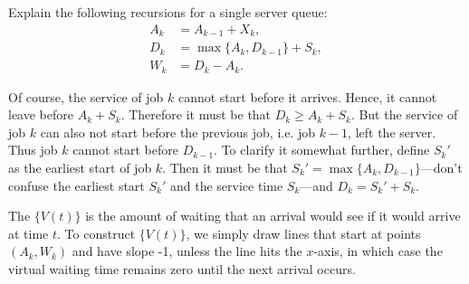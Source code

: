 \begin{extra}
\begin{solution}
\begin{comment}
\begin{pyconsole}
import lea

W = 3
S = lea.vals(1, 2)
S
X = lea.vals(1, 3)
X

# This is WQ1
W = lea.max_of(W + S - X, 0, fast=True)
W

# This is WQ2
W = lea.max_of(W + S - X, 0, fast=True)
W
\end{pyconsole}
Great! Our handiwork matches with the computer's results. 
\end{comment}

\end{solution}
\end{extra}



\begin{exercise} 
Explain the following recursions for a single server queue: 
\begin{equation}
 \label{eq:45}
 \begin{split}
 A_k &= A_{k-1} + X_k, \\
 D_k &= \max\{A_k, D_{k-1}\} + S_k,\\
 W_k &= D_k - A_k.
 \end{split}
\end{equation}

\begin{solution}
 Of course, the service of job $k$ cannot start before it arrives.
 Hence, it cannot leave before $A_k + S_k$.
 Therefore it must be that $D_k \geq A_k +S_k$.
 But the service of job $k$ can also not start before the previous job, i.e.
 job $k-1$, left the server.
 Thus job $k$ cannot start before $D_{k-1}$.
 To clarify it somewhat further, define $S_k'$ as the earliest start of job $k$.
 Then it must be that $S_k' = \max\{A_k, D_{k-1}\}$---don't confuse the earliest start $S_k'$ and the service time $S_k$---and $D_k = S_k' + S_k$.
\end{solution}
\end{exercise}

The  $\{V(t)\}$ is the amount of waiting that an arrival would see if it would arrive at time $t$.
To construct $\{V(t)\}$, we simply draw lines that start at points $(A_k, W_k)$ and have slope -1, unless the line hits the $x$-axis, in which case the virtual waiting time remains zero until the next arrival occurs.


